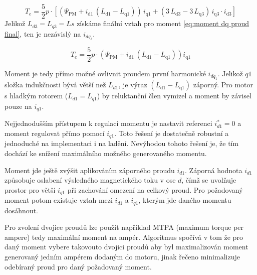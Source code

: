   \begin{equation}
     \label{eq:moment dq proud}
      T_e = \frac{5}{2} p \cdot \left[
     \left(\Psi _{\mathrm{PM}}+i_{\mathrm{d1}}\,\left(L_{\mathrm{d1}}-L_{\mathrm{q1}}\right)\right)\,i_{\mathrm{q1}}+
     \left(3\,L_{\mathrm{d3}}-3\,L_{\mathrm{q3}}\right)\,i_{\mathrm{q3}}\cdot i_{\mathrm{d3}} \right]
 \end{equation}
 Jelikož $L_{d3}=L_{q3}=Ls$ získáme finální vztah pro moment \ref{eq:moment dq proud final}, ten je nezávislý na $i_{dq_3}$.

 \begin{equation}
     \label{eq:moment dq proud final}
     T_e = \frac{5}{2} p \cdot 
     \left(\Psi _{\mathrm{PM}}+i_{\mathrm{d1}}\,\left(L_{\mathrm{d1}}-L_{\mathrm{q1}} \right) \right)i_{\mathrm{q1}}
 \end{equation}

Moment je tedy přímo možné ovlivnit proudem první harmonické $i_{dq_1}$. Jelikož $q1$ složka indukčnosti bývá větší než $L_{d1}$, je výraz $\left(L_{\mathrm{d1}}-L_{\mathrm{q1}} \right) $ záporný\cite{petros}. Pro motor s hladkým rotorem ($L_{d1}=L_{q1}$) by reluktanční člen vymizel a moment by závisel pouze na $i_{q1}$.

Nejjednodušším přístupem k regulaci momentu je nastavit referenci $i_{d1}^*=0$ a moment regulovat přímo pomocí $i_{q1}$. Toto řešení je dostatečně robustní a jednoduché na implementaci i na ladění. Nevýhodou tohoto řešení je, že tím dochází ke snížení maximálního možného generovaného momentu. 

Moment jde ještě zvýšit aplikováním záporného proudu $i_{d1}$. Záporná hodnota $i_{d1}$ způsobuje oslabení výsledného magnetického toku v ose $d$, čímž se uvolňuje prostor pro větší $i_{q1}$ při zachování omezení na celkový proud. Pro požadovaný moment potom existuje vztah mezi $i_{d1}$ a $i_{q1}$, kterým jde daného momentu dosáhnout.


Pro zvolení dvojice proudů lze použít například MTPA (maximum torque per ampere) tedy maximální moment na ampér. Algoritmus spočívá v tom že pro daný moment vybere takovouto dvojici proudů aby byl maximalizován moment generovaný jedním ampérem dodaným do motoru, jinak řečeno minimalizuje odebíraný proud pro daný požadovaný moment.\cite{petros}





